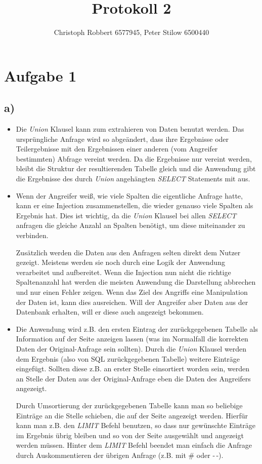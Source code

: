 \documentclass[10pt,a4paper]{article}
\author{Christoph Robbert 6577945, Peter Stilow 6500440}
\title{Protokoll 2}
\begin{document}
\maketitle
 
\section*{Aufgabe 1}

\subsection*{a)}
\begin{itemize}
	\item Die \textit{Union} Klausel kann zum extrahieren von Daten benutzt werden. Das ursprüngliche Anfrage wird so abgeändert, dass ihre Ergebnisse oder Teilergebnisse mit den Ergebnissen einer anderen (vom Angreifer bestimmten) Abfrage vereint werden. Da die Ergebnisse nur vereint werden, bleibt die Struktur der resultierenden Tabelle gleich und die Anwendung gibt die Ergebnisse des durch \textit{Union} angehängten \textit{SELECT} Statements mit aus.
	\item Wenn der Angreifer weiß, wie viele Spalten die eigentliche Anfrage hatte, kann er eine Injection zusammenstellen, die wieder genauso viele Spalten als Ergebnis hat. Dies ist wichtig, da die \textit{Union} Klausel bei allen \textit{SELECT} anfragen die gleiche Anzahl an Spalten benötigt, um diese miteinander zu verbinden.

Zusätzlich werden die Daten aus den Anfragen selten direkt dem Nutzer gezeigt. Meistens werden sie noch durch eine Logik der Anwendung verarbeitet und aufbereitet. Wenn die Injection nun nicht die richtige Spaltenanzahl hat werden die meisten Anwendung die Darstellung abbrechen und nur einen Fehler zeigen. Wenn das Ziel des Angriffs eine Manipulation der Daten ist, kann dies ausreichen. Will der Angreifer aber Daten aus der Datenbank erhalten, will er diese auch angezeigt bekommen.
	\item Die Anwendung wird z.B. den ersten Eintrag der zurückgegebenen Tabelle als Information auf der Seite anzeigen lassen (was im Normalfall die korrekten Daten der Original-Anfrage sein sollten). Durch die \textit{Union} Klausel werden dem Ergebnis (also von SQL zurückgegebenen Tabelle) weitere Einträge eingefügt. Sollten diese z.B. an erster Stelle einsortiert worden sein, werden an Stelle der Daten aus der Original-Anfrage eben die Daten des Angreifers angezeigt.
	
Durch Umsortierung der zurückgegebenen Tabelle kann man so beliebige Einträge an die Stelle schieben, die auf der Seite angezeigt werden. Hierfür kann man z.B. den \textit{LIMIT} Befehl benutzen, so dass nur gewünschte Einträge im Ergebnis übrig bleiben und so von der Seite ausgewählt und angezeigt werden müssen. Hinter dem \textit{LIMIT} Befehl beendet man einfach die Anfrage durch Auskommentieren der übrigen Anfrage (z.B. mit \# oder -\,-).
\end{itemize}
\end{document}

